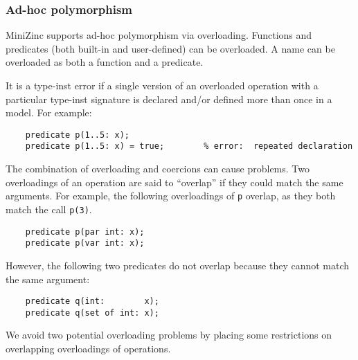 \documentclass[10pt]{scrartcl}
\begin{document}
\subsubsection{Ad-hoc polymorphism}
MiniZinc supports ad-hoc polymorphism via overloading.  Functions
and predicates (both built-in and user-defined) can be overloaded.  A name
can be overloaded as both a function and a predicate.

It is a type-inst error if a single version of an overloaded operation with
a particular type-inst signature is declared and/or defined more than once
in a model.  For example:
\begin{verbatim}
    predicate p(1..5: x);
    predicate p(1..5: x) = true;        % error:  repeated declaration
\end{verbatim}

The combination of overloading and coercions can cause problems.
Two overloadings of an operation are said to ``overlap'' if they could match
the same arguments.  For example, the following overloadings of \texttt{p}
overlap, as they both match the call \texttt{p(3)}.
\begin{verbatim}
    predicate p(par int: x);
    predicate p(var int: x);
\end{verbatim}
However, the following two predicates do not overlap because they cannot
match the same argument:
\begin{verbatim}
    predicate q(int:        x);
    predicate q(set of int: x);
\end{verbatim}
We avoid two potential overloading problems by placing some restrictions on
overlapping overloadings of operations.
\end{document}
